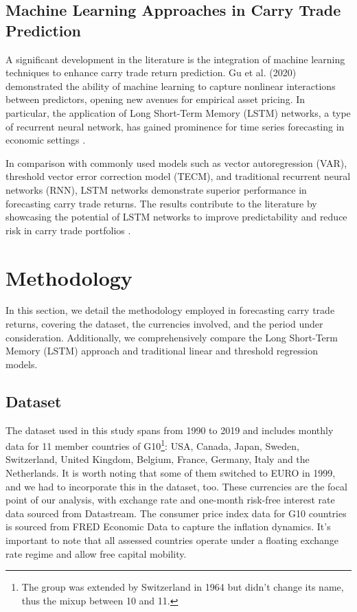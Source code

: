 \documentclass[a4paper,10pt]{article}
\begin{document}
\subsection{Machine Learning Approaches in Carry Trade Prediction}

A significant development in the literature is the integration of machine learning techniques to enhance carry trade return prediction. Gu et al. (2020) ~\cite{gu2020empirical} demonstrated the ability of machine learning to capture nonlinear interactions between predictors, opening new avenues for empirical asset pricing. In particular, the application of Long Short-Term Memory (LSTM) networks, a type of recurrent neural network, has gained prominence for time series forecasting in economic settings \cite{wang2021machine}.

In comparison with commonly used models such as vector autoregression (VAR), threshold vector error correction model (TECM), and traditional recurrent neural networks (RNN), LSTM networks demonstrate superior performance in forecasting carry trade returns. The results contribute to the literature by showcasing the potential of LSTM networks to improve predictability and reduce risk in carry trade portfolios \cite{davis2020economic}.


\section{Methodology}

In this section, we detail the methodology employed in forecasting carry trade returns, covering the dataset, the currencies involved, and the period under consideration. Additionally, we comprehensively compare the Long Short-Term Memory (LSTM) approach and traditional linear and threshold regression models.

\subsection{Dataset}

The dataset used in this study spans from 1990 to 2019 and includes monthly data for 11 member countries of G10\footnote{The group was extended by Switzerland in 1964 but didn't change its name, thus the mixup between 10 and 11.}: USA, Canada, Japan, Sweden, Switzerland, United Kingdom, Belgium, France, Germany, Italy and the Netherlands. It is worth noting that some of them switched to EURO in 1999, and we had to incorporate this in the dataset, too. These currencies are the focal point of our analysis, with exchange rate and one-month risk-free interest rate data sourced from Datastream. The consumer price index data for G10 countries is sourced from FRED Economic Data to capture the inflation dynamics. It's important to note that all assessed countries operate under a floating exchange rate regime and allow free capital mobility.
\end{document}
